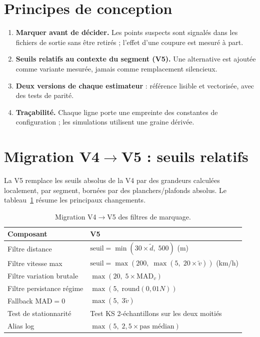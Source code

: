 \documentclass[12pt,a4paper]{report}
\theoremstyle{definition}
\begin{document}
\section{Principes de conception}

\begin{enumerate}
  \item \textbf{Marquer avant de décider.} Les points suspects sont signalés dans les
  fichiers de sortie sans être retirés ; l'effet d'une coupure est mesuré à part.
  \item \textbf{Seuils relatifs au contexte du segment (V5).} Une alternative est ajoutée
  comme variante mesurée, jamais comme remplacement silencieux.
  \item \textbf{Deux versions de chaque estimateur} : référence lisible et vectorisée,
  avec des tests de parité.
  \item \textbf{Traçabilité.} Chaque ligne porte une empreinte des constantes de
  configuration ; les simulations utilisent une graine dérivée.
\end{enumerate}

\section{Migration V4\texorpdfstring{$\to$}{->}V5 : seuils relatifs}

La V5 remplace les seuils absolus de la V4 par des grandeurs calculées localement, par
segment, bornées par des planchers/plafonds absolus. Le tableau~\ref{tab:migration}
résume les principaux changements.

\begin{table}[ht]
\centering
\caption{Migration V4$\to$V5 des filtres de marquage.}
\label{tab:migration}
\small
\begin{tabular}{p{4.2cm}p{8.5cm}}
\toprule
\textbf{Composant} & \textbf{V5} \\
\midrule
Filtre distance & $\text{seuil} = \min(30 \times \tilde d,\; 500)$ (m) \\
Filtre vitesse max & $\text{seuil} = \max(200,\; \max(5,\; 20 \times \tilde v))$ (km/h) \\
Filtre variation brutale & $\max(20,\; 5 \times \mathrm{MAD}_v)$ \\
Filtre persistance régime & $\max(5,\; \mathrm{round}(0{,}01 N))$ \\
Fallback MAD$=0$ & $\max(5,\; 3 \tilde v)$ \\
Test de stationnarité & Test KS 2-échantillons sur les deux moitiés \\
Alias log & $\max(5,\; 2{,}5 \times \text{pas médian})$ \\
\bottomrule
\end{tabular}
\end{table}
\end{document}
